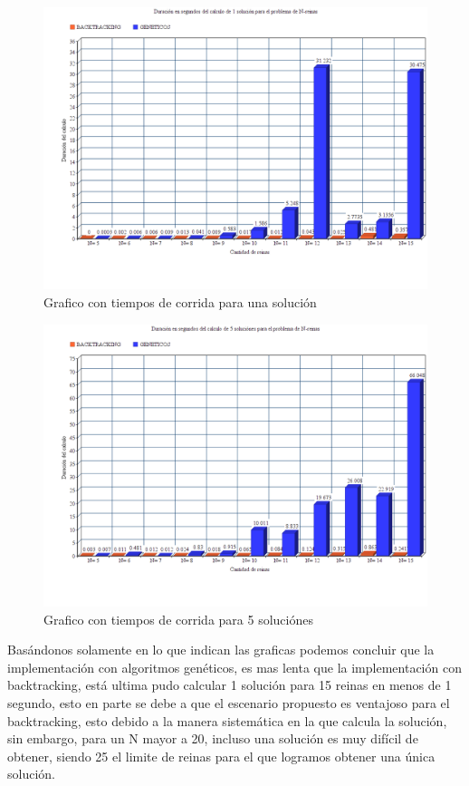 \documentclass[12pt,a4paper]{article}
\begin{document}
\begin{figure}[htp]
\centering
\graphicspath{ {imagenes/} }
\includegraphics[scale=0.60]{analisis1.png}
\caption{Grafico con tiempos de corrida para una solución}
\label{foto}
\end{figure}
\pagebreak

\begin{figure}[htp]
\centering
\graphicspath{ {imagenes/} }
\includegraphics[scale=0.60]{analisis5.png}
\caption{Grafico con tiempos de corrida para 5 soluciónes}
\label{foto}
\end{figure}

Basándonos solamente en lo que indican las graficas podemos concluir que la implementación con algoritmos genéticos, es mas lenta que la implementación con backtracking, está ultima pudo calcular 1 solución para 15 reinas en menos de 1 segundo, esto en parte se debe a que el escenario propuesto es ventajoso para el backtracking, esto debido a la manera sistemática en la que calcula la solución, sin embargo, para un N mayor a 20, incluso una solución es muy difícil de obtener, siendo 25 el limite de reinas para el que logramos obtener una única solución.
\end{document}

